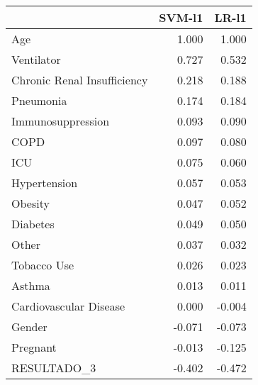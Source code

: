\begin{tabular}{lrr}
\toprule
{} &  SVM-l1 &  LR-l1 \\
\midrule
Age                         &   1.000 &  1.000 \\
Ventilator                  &   0.727 &  0.532 \\
Chronic Renal Insufficiency &   0.218 &  0.188 \\
Pneumonia                   &   0.174 &  0.184 \\
Immunosuppression           &   0.093 &  0.090 \\
COPD                        &   0.097 &  0.080 \\
ICU                         &   0.075 &  0.060 \\
Hypertension                &   0.057 &  0.053 \\
Obesity                     &   0.047 &  0.052 \\
Diabetes                    &   0.049 &  0.050 \\
Other                       &   0.037 &  0.032 \\
Tobacco Use                 &   0.026 &  0.023 \\
Asthma                      &   0.013 &  0.011 \\
Cardiovascular Disease      &   0.000 & -0.004 \\
Gender                      &  -0.071 & -0.073 \\
Pregnant                    &  -0.013 & -0.125 \\
RESULTADO\_3                 &  -0.402 & -0.472 \\
\bottomrule
\end{tabular}
